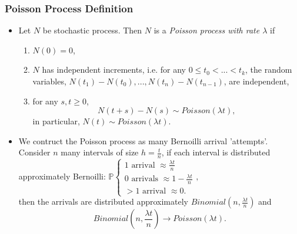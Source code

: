 \documentclass{beamer}
\begin{document}
\begin{frame}
  \frametitle{Poisson Process Definition} 

  \begin{itemize}
  \pause
  \item Let $N$ be stochastic process. Then $N$ is a \textit{Poisson process with rate $\lambda$} if
    \begin{enumerate}
    \item $N(0)=0$,
    \item $N$ has independent increments, i.e. for any $0\leq t_0 < ... < t_k$, the random variables, $N(t_1)-N(t_0),...,N(t_n)-N(t_{n-1})$, are independent,   
\item for any $s,t\geq0$, $$N(t+s)-N(s) \sim Poisson(\lambda t),$$
  in particular, $N(t) \sim Poisson(\lambda t).$
  \end{enumerate}
  \end{itemize}

  \pause
\begin{itemize}
\pause
\item We contruct the Poisson process as many Bernoilli arrival 'attempts'. Consider $n$ many intervals of size $h=\frac{t}{n}$, if each interval is distributed approximately Bernoilli: $\mathbb{P} \begin{cases} 1 \text{ arrival } \approx \frac{\lambda t}{n}\\ 0 \text{ arrivals } \approx 1-\frac{\lambda t}{n} \\ > 1 \text{ arrival } \approx 0.\end{cases},$ \\ then the arrivals are distributed approximately $Binomial(n, \frac{\lambda t}{n})$ and $$Binomial \left(n, \frac{\lambda t}{n} \right) \to Poisson(\lambda t).$$

  \end{itemize}
\end{frame}
\end{document}
